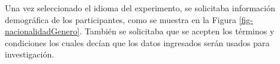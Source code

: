 Una vez seleccionado el idioma del experimento, se solicitaba informaci\'on demogr\'afica de los participantes, como se muestra en la Figura \ref{fig-nacionalidadGenero}. Tambi\'en se solicitaba que se acepten los t\'erminos y condiciones los cuales dec\'ian que los datos ingresados ser\'an usados para investigaci\'on.

%


%




